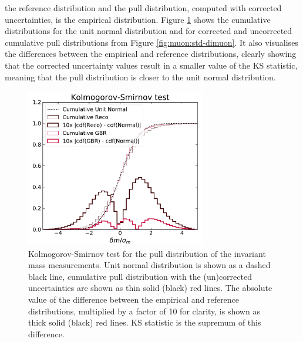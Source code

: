 the reference distribution and the pull distribution, computed with
corrected uncertainties, is the empirical distribution. Figure
\ref{fig:muon:std-ks} shows the cumulative distributions for the unit
normal distribution and for corrected and uncorrected cumulative pull
distributions from Figure \ref{fig:muon:std-dimuon}. It also visualises
the differences between the empirical and reference distributions, clearly
showing that the corrected uncertainty values result in a smaller 
value of the KS statistic, meaning that the pull distribution is closer
to the unit normal distribution.
\begin{figure}[h!]
  \centering
  \includegraphics[width=0.7\textwidth]{figures/muons/vader-std-ks}
  \caption[Kolmogorov-Smirnov statistic of the uncertainty correction]
  {Kolmogorov-Smirnov test for the pull distribution of the invariant
  mass measurements. Unit normal distribution is shown as a dashed black
  line, cumulative pull distribution with the (un)corrected uncertainties
  are shown as thin solid (black) red lines. The absolute value of the
  difference between the empirical and reference distributions,
  multiplied by a factor of 10 for clarity, is shown as thick solid
  (black) red lines. KS statistic is the supremum of this difference.
  }
  \label{fig:muon:std-ks}
\end{figure}

